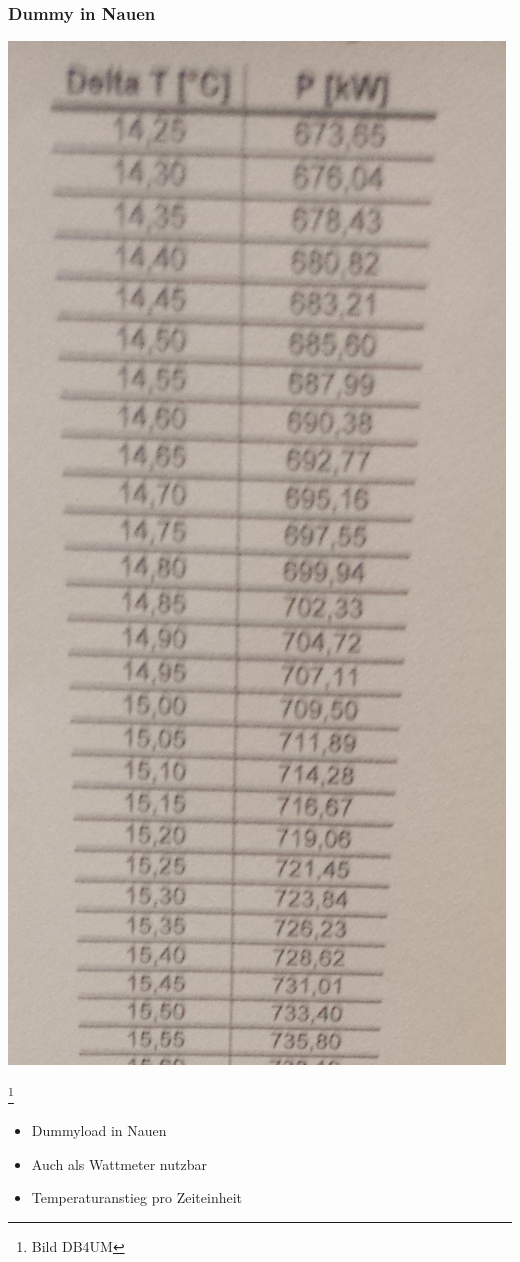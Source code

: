 \begin{frame}
    \frametitle{Dummy in Nauen}
	\begin{minipage}{0.4\textwidth}
	\begin{center}
	    \includegraphics[width=.9\textwidth]{e17/DummyNauen.jpg}
	\end{center}
	\end{minipage}
	        \footnote{\tiny Bild DB4UM}
		\hspace{0.5cm}
	\begin{minipage}{0.4\textwidth}	
	\begin{itemize}
		\item Dummyload in Nauen
		\item Auch als Wattmeter nutzbar
		\item Temperaturanstieg pro Zeiteinheit
	\end{itemize}
	\end{minipage}
\end{frame}

